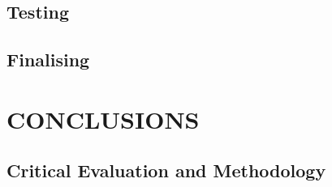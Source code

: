 \documentclass[a4paper, 10pt]{IEEEconf}
\begin{document}
\subsection{Testing}

%
%


\subsection{Finalising}

%

\clearpage
\section{CONCLUSIONS}

\subsection{Critical Evaluation and Methodology}

%
\end{document}
